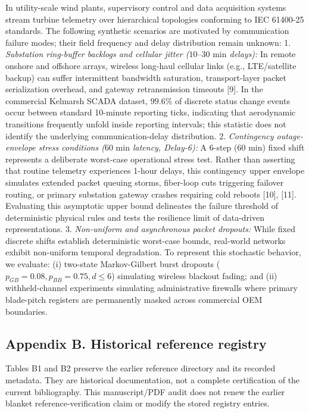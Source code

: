 \documentclass[
  journal]{IEEEtran}
\begin{document}
In utility-scale wind plants, supervisory control and data acquisition
systems stream turbine telemetry over hierarchical topologies conforming
to IEC 61400-25 standards. The following synthetic scenarios are
motivated by communication failure modes; their field frequency and
delay distribution remain unknown: 1. \emph{Substation ring-buffer
backlogs and cellular jitter (\(10\text{--}30\text{ min}\) delays):} In
remote onshore and offshore arrays, wireless long-haul cellular links
(e.g., LTE/satellite backup) can suffer intermittent bandwidth
saturation, transport-layer packet serialization overhead, and gateway
retransmission timeouts {[}9{]}. In the commercial Kelmarsh SCADA
dataset, \(99.6\%\) of discrete status change events occur between
standard 10-minute reporting ticks, indicating that aerodynamic
transitions frequently unfold inside reporting intervals; this statistic
does not identify the underlying communication-delay distribution. 2.
\emph{Contingency outage-envelope stress conditions (\(60\text{ min}\)
latency, Delay-6):} A 6-step (\(60\text{ min}\)) fixed shift represents
a deliberate worst-case operational stress test. Rather than asserting
that routine telemetry experiences 1-hour delays, this contingency upper
envelope simulates extended packet queuing storms, fiber-loop cuts
triggering failover routing, or primary substation gateway crashes
requiring cold reboots {[}10{]}, {[}11{]}. Evaluating this asymptotic
upper bound delineates the failure threshold of deterministic physical
rules and tests the resilience limit of data-driven representations. 3.
\emph{Non-uniform and asynchronous packet dropouts:} While fixed
discrete shifts establish deterministic worst-case bounds, real-world
networks exhibit non-uniform temporal degradation. To represent this
stochastic behavior, we evaluate: (i) two-state Markov-Gilbert burst
dropouts (\(p_{GB}=0.08, p_{BB}=0.75, d \le 6\)) simulating wireless
blackout fading; and (ii) withheld-channel experiments simulating
administrative firewalls where primary blade-pitch registers are
permanently masked across commercial OEM boundaries.

\FloatBarrier

\subsection*{Appendix B. Historical reference
registry}\label{appendix-b.-historical-reference-registry}

Tables B1 and B2 preserve the earlier reference directory and its
recorded metadata. They are historical documentation, not a complete
certification of the current bibliography. This manuscript/PDF audit
does not renew the earlier blanket reference-verification claim or
modify the stored registry entries.
\end{document}
